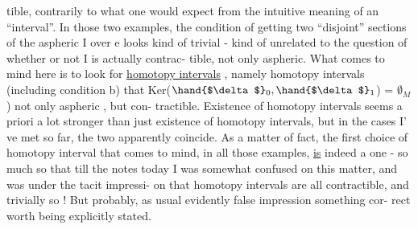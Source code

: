 tible,  contrarily to what one would expect from the intuitive meaning of
an ``interval''.  In those two examples,  the condition of getting two
``disjoint'' sections of the aspheric I over e  looks kind of trivial - 
kind of unrelated to the question of whether or not I is actually contrac-%
tible,  not only aspheric.  What comes to mind here is to look for  
\uline{homotopy intervals} ,  namely homotopy intervals  (including condition b)
that Ker($\hand{$\delta$}_0,\hand{$\delta$}_1$) = $\emptyset_M$ )    not only aspheric , but    con-%
tractible.  Existence of   homotopy intervals seems a priori a lot
stronger than just existence of homotopy intervals,  but in the cases I'
ve met so far,  the two apparently coincide.  As a matter of fact,  the
 first choice of homotopy interval that comes to mind,  in all those
examples,  \uline{is} indeed a   one  -  so much so that till the notes today
I was somewhat confused on this matter,  and was under the tacit impressi-%
on that homotopy intervals are all contractible,  and trivially so ! But
probably,  as usual   evidently false impression  something cor-%
rect   worth  being explicitly stated.

